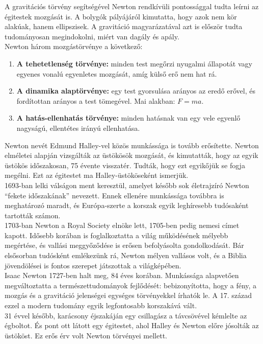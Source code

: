 \documentclass{article}
\begin{document}
A gravitációs törvény segítségével Newton rendkívüli pontossággal tudta leírni az égitestek mozgását is. A bolygók pályájáról kimutatta, hogy azok nem kör alakúak, hanem ellipszisek. A gravitáció magyarázatával azt is először tudta tudományosan megindokolni, miért van dagály és apály.\\

Newton három mozgástörvénye a következő:
\begin{enumerate}
    \item \textbf{A tehetetlenség törvénye:} minden test megőrzi nyugalmi állapotát vagy egyenes vonalú egyenletes mozgását, amíg külső erő nem hat rá.
    \item \textbf{A dinamika alaptörvénye:} egy test gyorsulása arányos az eredő erővel, és fordítottan arányos a test tömegével. Mai alakban: $F = m a$.
    \item \textbf{A hatás-ellenhatás törvénye:} minden hatásnak van egy vele egyenlő nagyságú, ellentétes irányú ellenhatása.
\end{enumerate}

Newton nevét Edmund Halley-vel közös munkássága is tovább erősítette. Newton elméletei alapján vizsgálták az üstökösök mozgását, és kimutatták, hogy az egyik üstökös időszakosan, 75 évente visszatér. Tudták, hogy ezt egyikőjük se fogja megélni. Ezt az égitestet ma Halley-üstököseként ismerjük.\\

1693-ban lelki válságon ment keresztül, amelyet később sok életrajzíró Newton ``fekete időszakának'' nevezett. Ennek ellenére munkássága továbbra is meghatározó maradt, és Európa-szerte a korszak egyik leghíresebb tudósaként tartották számon.\\

1703-ban Newton a Royal Society elnöke lett, 1705-ben pedig nemesi címet kapott. Idősebb korában is foglalkoztatta a világ működésének mélyebb megértése, és vallási meggyőződése is erősen befolyásolta gondolkodását. Bár elsősorban tudósként emlékezünk rá, Newton mélyen vallásos volt, és a Biblia jövendölései is fontos szerepet játszottak a világképében.\\

Isaac Newton 1727-ben halt meg, 84 éves korában. Munkássága alapvetően megváltoztatta a természettudományok fejlődését: bebizonyította, hogy a fény, a mozgás és a gravitáció jelenségei egységes törvényekkel írhatók le. A 17. század ezzel a modern tudomány egyik legfontosabb korszakává vált.\\

31 évvel később, karácsony éjszakáján egy csillagász a távcsövével kémlelte az égboltot. És pont ott látott egy égitestet, ahol Halley és Newton előre jósolták az üstököst. Ez erős érv volt Newton törvényei mellett.
\end{document}
